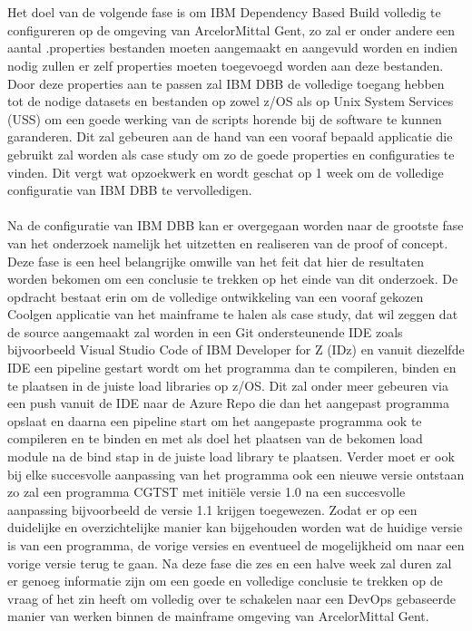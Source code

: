 \\ \\
Het doel van de volgende fase is om IBM Dependency Based Build volledig te configureren op de omgeving van ArcelorMittal Gent,
zo zal er onder andere een aantal .properties bestanden moeten aangemaakt en aangevuld worden en indien nodig zullen er zelf properties moeten toegevoegd worden aan deze bestanden.
Door deze properties aan te passen zal IBM DBB de volledige toegang hebben tot de nodige datasets en bestanden op zowel z/OS als op Unix System Services (USS) om een goede werking van de scripts horende bij de software te kunnen garanderen. Dit zal gebeuren aan de hand van een vooraf bepaald applicatie die gebruikt zal worden als case study om zo de goede properties en configuraties te vinden.
Dit vergt wat opzoekwerk en wordt geschat op 1 week om de volledige configuratie van IBM DBB te vervolledigen.
\\ \\
Na de configuratie van IBM DBB kan er overgegaan worden naar de grootste fase van het onderzoek namelijk het uitzetten en realiseren van de proof of concept.
Deze fase is een heel belangrijke omwille van het feit dat hier de resultaten worden bekomen om een conclusie te trekken op het einde van dit onderzoek.
De opdracht bestaat erin om de volledige ontwikkeling van een vooraf gekozen Coolgen applicatie van het mainframe te halen als case study,
dat wil zeggen dat de source aangemaakt zal worden in een Git ondersteunende IDE zoals bijvoorbeeld Visual Studio Code of IBM Developer for Z (IDz) en vanuit diezelfde IDE een pipeline
gestart wordt om het programma dan te compileren, binden en te plaatsen in de juiste load libraries op z/OS.
Dit zal onder meer gebeuren via een push vanuit de IDE naar de Azure Repo die dan het aangepast programma opslaat en daarna een pipeline start om het aangepaste programma ook
te compileren en te binden en met als doel het plaatsen van de bekomen load module na de bind stap in de juiste load library te plaatsen.
Verder moet er ook bij elke succesvolle aanpassing van het programma ook een nieuwe versie ontstaan zo zal een programma CGTST met initiële versie 1.0 na een succesvolle
aanpassing bijvoorbeeld de versie 1.1 krijgen toegewezen.
Zodat er op een duidelijke en overzichtelijke manier kan bijgehouden worden wat de huidige versie is van een programma, de vorige versies en eventueel de mogelijkheid om naar een vorige versie terug te gaan.
Na deze fase die zes en een halve week zal duren zal er genoeg informatie zijn om een goede en volledige conclusie te trekken op de vraag of het zin heeft om volledig over te schakelen naar een DevOps gebaseerde manier van werken binnen de mainframe omgeving van ArcelorMittal Gent.
